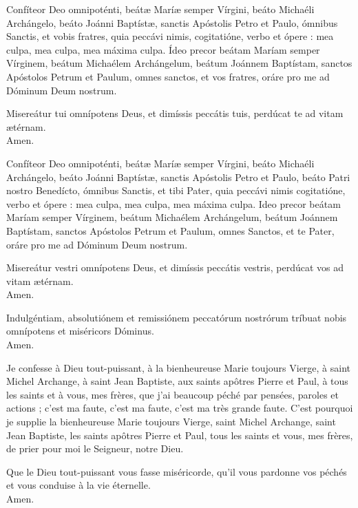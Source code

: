 \documentclass[twoside]{article}
\begin{document}
\begin{paracol}[1]{2}

\vv Confíteor Deo omnipoténti, beátæ Maríæ semper Vírgini, beáto Michaéli Archángelo, beáto Joánni Baptístæ, sanctis Apóstolis Petro et Paulo, ómnibus Sanctis, et vobis fratres, quia peccávi nimis, cogitatióne, verbo et ópere : mea culpa, mea culpa, mea máxima culpa. Ídeo precor beátam Maríam semper Vírginem, beátum Michaélem Archángelum, beátum Joánnem Baptístam, sanctos Apóstolos Petrum et Paulum, omnes sanctos, et vos fratres, oráre pro me ad Dóminum Deum nostrum.

\rr Misereátur tui omnípotens Deus, et dimíssis peccátis tuis, perdúcat te ad vitam ætérnam. \\
\vv Amen.

\rr Confíteor Deo omnipoténti, beátæ Maríæ semper Vírgini, beáto Michaéli Archángelo, beáto Joánni Baptístæ, sanctis Apóstolis Petro et Paulo, beáto Patri nostro Benedícto, ómnibus Sanctis, et tibi Pater, quia peccávi nimis cogitatióne, verbo et ópere : mea culpa, mea culpa, mea máxima culpa.
Ideo precor beátam Maríam semper Vírginem, beátum Michaélem Archángelum, beátum Joánnem Baptístam, sanctos Apóstolos Petrum et Paulum, omnes Sanctos, et te Pater, oráre pro me ad Dóminum Deum nostrum.

\vv Misereátur vestri omnípotens Deus, et dimíssis peccátis vestris, perdúcat vos ad vitam ætérnam. \\
\rr Amen.

\vv Indulgéntiam, \cc absolutiónem et remissiónem peccatórum nostrórum tríbuat nobis omnípotens et miséricors Dóminus. \\
\rr Amen. 

\switchcolumn


\vv Je confesse à Dieu tout-puissant, à la bienheureuse Marie toujours Vierge, à saint Michel Archange, à saint Jean Baptiste, aux saints apôtres Pierre et Paul, à tous les saints et à vous, mes frères, que j’ai beaucoup péché par pensées, paroles et actions ; c’est ma faute, c’est ma faute, c’est ma très grande faute.
C’est pourquoi je supplie la bienheureuse Marie toujours Vierge, saint Michel Archange, saint Jean Baptiste, les saints apôtres Pierre et Paul, tous les saints et vous, mes frères, de prier pour moi le Seigneur, notre Dieu.

\rr Que le Dieu tout-puissant vous fasse miséricorde, qu’il vous pardonne vos péchés et vous conduise à la vie éternelle.\\
\vv Amen.


\end{paracol}
\end{document}
